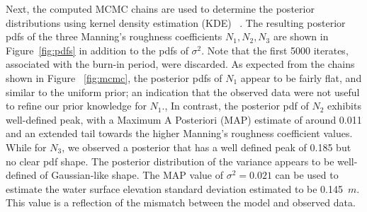 Next, the computed MCMC chains are used to determine the posterior 
distributions using kernel density estimation (KDE)
~\citep{Parzen1962,Silverman1986}.  The resulting posterior pdfs 
of the three Manning's roughness coefficients $N_1,N_2,N_3$ are shown 
in Figure~\ref{fig:pdfs} in addition to the pdfs of $\sigma^2$. 
Note that the first 5000 iterates, associated with the burn-in period, were discarded.  
As expected from the chains shown in Figure
~\ref{fig:mcmc}, the posterior pdfs of $N_1$ appear to be fairly flat, 
and similar to the uniform prior; an indication that 
the observed data were not useful to refine our prior knowledge for $N_1$.,
In contrast, the posterior pdf of $N_2$ exhibits well-defined peak, 
with a Maximum A Posteriori (MAP) estimate of around 0.011
and an extended tail towards the higher Manning's roughness coefficient values.
While for $N_3$, we observed a posterior that has a well defined peak
of 0.185 but no clear pdf shape. The posterior distribution of the variance 
appears to be well-defined of Gaussian-like shape. 
The MAP value of $\sigma^2=0.021$ can be used to estimate the water surface elevation standard 
deviation estimated to be 0.145~$m$. 
This value is a reflection of the mismatch between the model and 
observed data.





